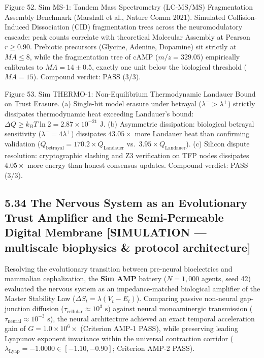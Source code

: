 \documentclass[
]{article}
\begin{document}
Figure 52. Sim MS-1: Tandem Mass Spectrometry (LC-MS/MS) Fragmentation
Assembly Benchmark (Marshall et al., Nature Comm 2021). Simulated
Collision-Induced Dissociation (CID) fragmentation trees across the
neuromodulatory cascade: peak counts correlate with theoretical
Molecular Assembly at Pearson \(r \ge 0.90\). Prebiotic precursors
(Glycine, Adenine, Dopamine) sit strictly at \(MA \le 8\), while the
fragmentation tree of cAMP (\(m/z = 329.05\)) empirically calibrates to
\(MA = 14 \pm 0.5\), exactly one unit below the biological threshold
(\(MA = 15\)). Compound verdict: PASS (3/3).

Figure 53. Sim THERMO-1: Non-Equilibrium Thermodynamic Landauer Bound on
Trust Erasure. (a) Single-bit model erasure under betrayal
(\(\lambda^- > \lambda^+\)) strictly dissipates thermodynamic heat
exceeding Landauer's bound:
\(\Delta Q \ge k_B T \ln 2 = 2.87 \times 10^{-21}\text{ J}\). (b)
Asymmetric dissipation: biological betrayal sensitivity
(\(\lambda^- = 4\lambda^+\)) dissipates \(43.05\times\) more Landauer
heat than confirming validation
(\(Q_{\mathrm{betrayal}} = 170.2 \times Q_{\mathrm{Landauer}}\)
vs.~\(3.95 \times Q_{\mathrm{Landauer}}\)). (c) Silicon dispute
resolution: cryptographic slashing and Z3 verification on TFP nodes
dissipates \(4.05\times\) more energy than honest consensus updates.
Compound verdict: PASS (3/3).

\subsection{5.34 The Nervous System as an Evolutionary Trust Amplifier
and the Semi-Permeable Digital Membrane {[}SIMULATION --- multiscale
biophysics \& protocol
architecture{]}}\label{the-nervous-system-as-an-evolutionary-trust-amplifier-and-the-semi-permeable-digital-membrane-simulation-multiscale-biophysics-protocol-architecture}

Resolving the evolutionary transition between pre-neural bioelectrics
and mammalian cephalization, the \textbf{Sim AMP} battery (\(N = 1,000\)
agents, seed 42) evaluated the nervous system as an impedance-matched
biological amplifier of the Master Stability Law
(\(\Delta S_t = \lambda(V_t - E_t)\)). Comparing passive non-neural
gap-junction diffusion
(\(\tau_{\text{cellular}} \approx 10^3\text{ s}\)) against neural
monoaminergic transmission
(\(\tau_{\text{neural}} \approx 10^{-3}\text{ s}\)), the neural
architecture achieved an exact temporal acceleration gain of
\textbf{\(G = 1.0 \times 10^6\times\)} (Criterion AMP-1 PASS), while
preserving leading Lyapunov exponent invariance within the universal
contraction corridor
(\(\lambda_{\text{Lyap}} = -1.0000 \in [-1.10, -0.90]\); Criterion AMP-2
PASS).
\end{document}
